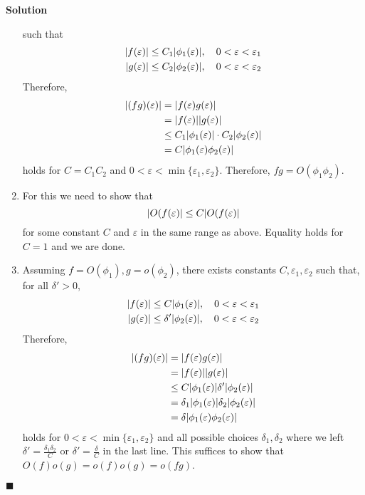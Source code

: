 \documentclass[11pt]{article}
\newcommand{\vep}{\varepsilon}
\DeclarePairedDelimiter\abs{\lvert}{\rvert}
\theoremstyle{problemstyle}
\newenvironment{solution}
  {\noindent\textbf{Solution}\quad}
  {\hfill$\blacksquare$\par\vspace{1em}}
\begin{document}
\begin{solution}
\begin{enumerate}
      such that
      \begin{align*}
        \abs{f(\vep)} & \leq C_1 \abs{\phi_1(\vep)}, \quad 0 < \vep < \vep_1 \\
        \abs{g(\vep)} & \leq C_2 \abs{\phi_2(\vep)}, \quad 0 < \vep < \vep_2
      \end{align*}
      Therefore,
      \begin{align*}
        \abs{(fg)(\vep)} 
          & = \abs{f(\vep)g(\vep)} \\
          & = \abs{f(\vep)}\abs{g(\vep)} \\
          & \leq C_1 \abs{\phi_1(\vep)} \cdot C_2 \abs{\phi_2(\vep)} \\
          & = C \abs{\phi_1(\vep)\phi_2(\vep)} \\
      \end{align*}
      holds for $C = C_1 C_2$ and $0 < \vep < \min\{\vep_1, \vep_2\}$.
      Therefore, $fg = O(\phi_1\phi_2)$.
    \item For this we need to show that
      \[\abs{O(f(\vep)} \leq C \abs{O(f(\vep)} \]
      for some constant $C$ and $\vep$ in the same range as above. Equality holds for $C = 1$ and
      we are done.
    \item Assuming $f = O(\phi_1), g = o(\phi_2)$, there exists constants $C,\vep_1,\vep_2$
      such that, for all $\delta' > 0$,
      \begin{align*}
        \abs{f(\vep)} & \leq C \abs{\phi_1(\vep)}, \quad 0 < \vep < \vep_1 \\
        \abs{g(\vep)} & \leq \delta' \abs{\phi_2(\vep)}, \quad 0 < \vep < \vep_2
      \end{align*}
      Therefore,
      \begin{align*}
        \abs{(fg)(\vep)} 
          & = \abs{f(\vep)g(\vep)} \\
          & = \abs{f(\vep)}\abs{g(\vep)} \\
          & \leq C \abs{\phi_1(\vep)} \delta' \abs{\phi_2(\vep)} \\
          & = \delta_1 \abs{\phi_1(\vep)} \delta_2 \abs{\phi_2(\vep)} \\
          & = \delta \abs{\phi_1(\vep)\phi_2(\vep)}
      \end{align*}
      holds for $0 < \vep < \min\{\vep_1, \vep_2\}$ and all possible choices $\delta_1, \delta_2$
      where we left $\delta' = \frac{\delta_1 \delta_2}{C}$ or $\delta' = \frac{\delta}{C}$ in the
      last line. This suffices to show that $O(f)o(g) = o(f)o(g) = o(fg)$.

  \end{enumerate} 
\end{solution}
 
\end{document}
